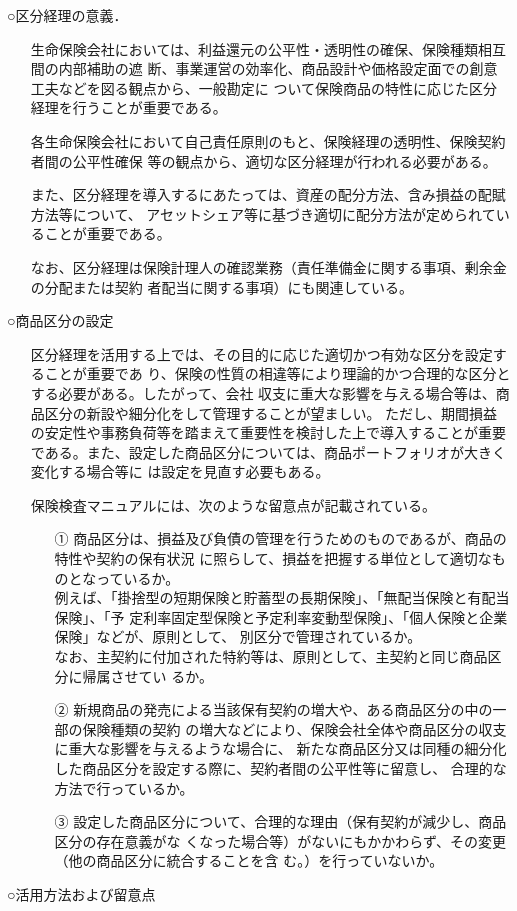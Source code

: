 \documentclass[report,gutter=10mm,fore-edge=10mm,uplatex,dvipdfmx]{jlreq}
\begin{document}
\noindent ○区分経理の意義．
\begin{itemize}
\item[] 生命保険会社においては、利益還元の公平性・透明性の確保、保険種類相互間の内部補助の遮
 断、事業運営の効率化、商品設計や価格設定面での創意工夫などを図る観点から、一般勘定に
 ついて保険商品の特性に応じた区分経理を行うことが重要である。
\item[] 各生命保険会社において自己責任原則のもと、保険経理の透明性、保険契約者間の公平性確保
 等の観点から、適切な区分経理が行われる必要がある。
\item[] また、区分経理を導入するにあたっては、資産の配分方法、含み損益の配賦方法等について、
 アセットシェア等に基づき適切に配分方法が定められていることが重要である。
\item[] なお、区分経理は保険計理人の確認業務（責任準備金に関する事項、剰余金の分配または契約
 者配当に関する事項）にも関連している。
\end{itemize}
\noindent ○商品区分の設定
\begin{itemize}
\item[] 区分経理を活用する上では、その目的に応じた適切かつ有効な区分を設定することが重要であ
 り、保険の性質の相違等により理論的かつ合理的な区分とする必要がある。したがって、会社
 収支に重大な影響を与える場合等は、商品区分の新設や細分化をして管理することが望ましい。
 ただし、期間損益の安定性や事務負荷等を踏まえて重要性を検討した上で導入することが重要
 である。また、設定した商品区分については、商品ポートフォリオが大きく変化する場合等に
 は設定を見直す必要もある。
\item[] 保険検査マニュアルには、次のような留意点が記載されている。
\begin{itemize}
\item[①] 商品区分は、損益及び負債の管理を行うためのものであるが、商品の特性や契約の保有状況
に照らして、損益を把握する単位として適切なものとなっているか。\\
 例えば、「掛捨型の短期保険と貯蓄型の長期保険」、「無配当保険と有配当保険」、「予
 定利率固定型保険と予定利率変動型保険」、「個人保険と企業保険」などが、原則として、
 別区分で管理されているか。\\
 なお、主契約に付加された特約等は、原則として、主契約と同じ商品区分に帰属させてい
 るか。
\item[②] 新規商品の発売による当該保有契約の増大や、ある商品区分の中の一部の保険種類の契約
 の増大などにより、保険会社全体や商品区分の収支に重大な影響を与えるような場合に、
 新たな商品区分又は同種の細分化した商品区分を設定する際に、契約者間の公平性等に留意し、
合理的な方法で行っているか。
\item[③] 設定した商品区分について、合理的な理由（保有契約が減少し、商品区分の存在意義がな
 くなった場合等）がないにもかかわらず、その変更（他の商品区分に統合することを含
 む。）を行っていないか。
\end{itemize}
\end{itemize}
\noindent ○活用方法および留意点
\end{document}
